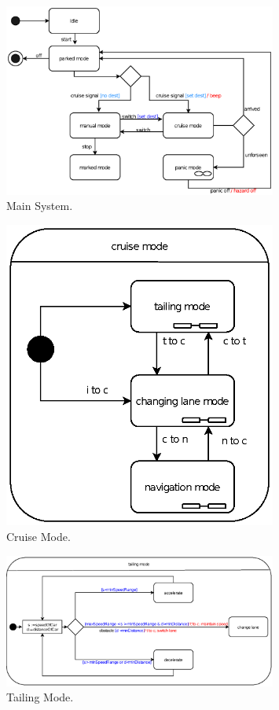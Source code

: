 \documentclass[12pt]{article}
\begin{document}
\begin{spacing}{1.5}
\begin{figure}[h!]
	\centering
		\includegraphics[width=0.8\textwidth]{./A2_Figures/4.1-Main-System.eps}
		  \caption{Main System.}
  \label{fig:main-system-fig}
\end{figure}

\begin{figure}[h!]
	\centering
		\includegraphics[width=0.8\textwidth]{./A2_Figures/A2_SOEN331_Cruise.eps}
		  \caption{Cruise Mode.}
  \label{fig:cruise-mode-fig}
\end{figure}

\begin{figure}[h!]
	\centering
		\includegraphics[width=0.8\textwidth]{./A2_Figures/A2_SOEN331_Tailing.eps}
		  \caption{Tailing Mode.}
  \label{fig:tailing-mode-fig}
\end{figure}


\end{spacing}
\end{document}
